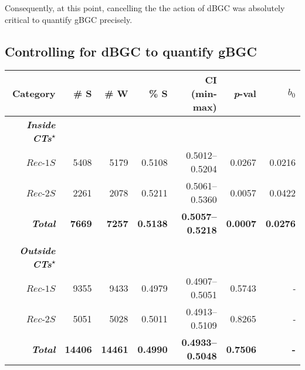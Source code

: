 Consequently, at this point, cancelling the the action of dBGC was absolutely critical to quantify gBGC precisely.







\subsection{Controlling for dBGC to quantify gBGC}

\begin{table}[b!]
    \centering
	\begin{adjustbox}{width = 1\textwidth}
		\begin{tabular}{rrrrrrr}


			\toprule
			\textbf{Category} & \textbf{\# S} & \textbf{\# W} & \textbf{\% S} & \textbf{CI (min-max)} & \textbf{\textit{p}-val} & \textbf{$b_0$} \\


			\midrule
			\textbf{\textit{Inside CTs\textsuperscript{$\star$}}}\\
			$Rec$-$1S$                 & 5408 & 5179 & 0.5108 & 0.5012--0.5204 & 0.0267 & 0.0216 \\
			$Rec$-$2S$                 & 2261 & 2078 & 0.5211 & 0.5061--0.5360 & 0.0057 & 0.0422 \\
			\textbf{\textit{Total}}    & \textbf{7669} & \textbf{7257} & \textbf{0.5138} & \textbf{0.5057--0.5218} & \textbf{0.0007} & \textbf{0.0276} \\
			\\
			\textbf{\textit{Outside CTs\textsuperscript{$\star$}}}\\
			$Rec$-$1S$                 & 9355 & 9433 & 0.4979 & 0.4907--0.5051 & 0.5743 & \textit{-} \\
			$Rec$-$2S$                 & 5051 & 5028 & 0.5011 & 0.4913--0.5109 & 0.8265 & \textit{-} \\
			\textbf{\textit{Total}}    & \textbf{14406} & \textbf{14461} & \textbf{0.4990} & \textbf{0.4933--0.5048} & \textbf{0.7506} & \textbf{-} \\
			\bottomrule


\end{tabular}
\end{adjustbox}
\end{table}
